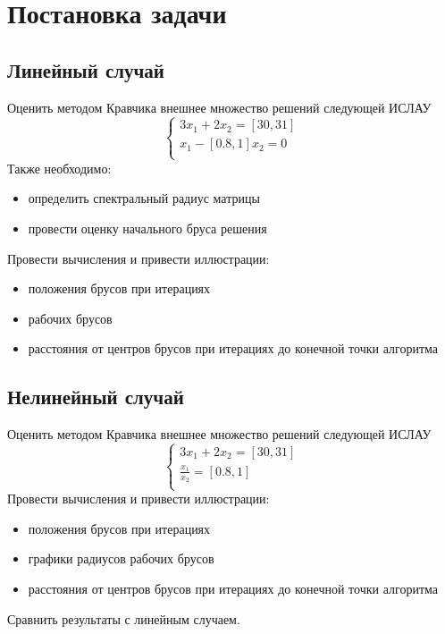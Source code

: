 \section{Постановка задачи}
\subsection{Линейный случай}
Оценить методом Кравчика внешнее множество решений следующей ИСЛАУ
\begin{equation*}
 \begin{cases}
   3x_1+2x_2 = [30, 31]\\
   x_1-[0.8, 1]x_2 = 0\\
 \end{cases}
\end{equation*}
Также необходимо:
\begin{itemize}
    \item определить спектральный радиус матрицы
    \item провести оценку начального бруса решения
\end{itemize}
Провести вычисления и привести иллюстрации:
\begin{itemize}
    \item положения брусов при итерациях
    \item рабочих брусов
    \item расстояния от центров брусов при итерациях до конечной точки алгоритма
\end{itemize}

\subsection{Нелинейный случай}
Оценить методом Кравчика внешнее множество решений следующей ИСЛАУ
\begin{equation*}
 \begin{cases}
   3x_1+2x_2 = [30, 31]\\
   \frac{x_1}{x_2} = [0.8, 1]\\
 \end{cases}
\end{equation*}
Провести вычисления и привести иллюстрации:
\begin{itemize}
    \item положения брусов при итерациях
    \item графики радиусов рабочих брусов
    \item расстояния от центров брусов при итерациях до конечной точки алгоритма
\end{itemize}
Сравнить результаты с линейным случаем.